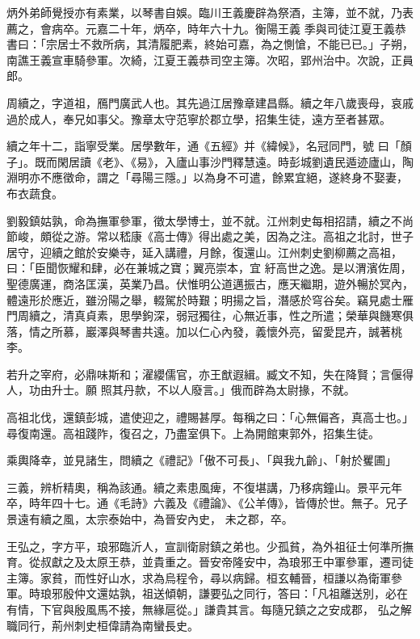 \begin{pinyinscope}
 炳外弟師覺授亦有素業，以琴書自娛。臨川王義慶辟為祭酒，主簿，並不就，乃表薦之，會病卒。元嘉二十年，炳卒，時年六十九。衡陽王義
 季與司徒江夏王義恭書曰：「宗居士不救所病，其清履肥素，終始可嘉，為之惻愴，不能已已。」子朔，南譙王義宣車騎參軍。次綺，江夏王義恭司空主簿。次昭，郢州治中。次說，正員郎。



 周續之，字道祖，鴈門廣武人也。其先過江居豫章建昌縣。續之年八歲喪母，哀戚過於成人，奉兄如事父。豫章太守范寧於郡立學，招集生徒，遠方至者甚眾。



 續之年十二，詣寧受業。居學數年，通《五經》并《緯候》，名冠同門，號
 曰「顏子」。既而閑居讀《老》、《易》，入廬山事沙門釋慧遠。時彭城劉遺民遁迹廬山，陶淵明亦不應徵命，謂之「尋陽三隱。」以為身不可遣，餘累宜絕，遂終身不娶妻，布衣蔬食。



 劉毅鎮姑孰，命為撫軍參軍，徵太學博士，並不就。江州刺史每相招請，續之不尚節峻，頗從之游。常以嵇康《高士傳》得出處之美，因為之注。高祖之北討，世子居守，迎續之館於安樂寺，延入講禮，月餘，復還山。江州刺史劉柳薦之高祖，曰：「臣聞恢耀和肆，必在兼城之寶；翼亮崇本，宜
 紆高世之逸。是以渭濱佐周，聖德廣運，商洛匡漢，英業乃昌。伏惟明公道邁振古，應天繼期，遊外暢於冥內，體遠形於應近，雖汾陽之舉，輟駕於時艱；明揚之旨，潛感於穹谷矣。竊見處士雁門周續之，清真貞素，思學鉤深，弱冠獨往，心無近事，性之所遣；榮華與饑寒俱落，情之所慕，巖澤與琴書共遠。加以仁心內發，義懷外亮，留愛昆卉，誠著桃李。



 若升之宰府，必鼎味斯和；濯纓儒官，亦王猷遐緝。臧文不知，失在降賢；言偃得人，功由升士。願
 照其丹款，不以人廢言。」俄而辟為太尉掾，不就。



 高祖北伐，還鎮彭城，遣使迎之，禮賜甚厚。每稱之曰：「心無偏吝，真高士也。」尋復南還。高祖踐阼，復召之，乃盡室俱下。上為開館東郭外，招集生徒。



 乘輿降幸，並見諸生，問續之《禮記》「傲不可長」、「與我九齡」、「射於矍圃」



 三義，辨析精奧，稱為該通。續之素患風痺，不復堪講，乃移病鐘山。景平元年卒，時年四十七。通《毛詩》六義及《禮論》、《公羊傳》，皆傳於世。無子。兄子景遠有續之風，太宗泰始中，為晉安內史，
 未之郡，卒。



 王弘之，字方平，琅邪臨沂人，宣訓衛尉鎮之弟也。少孤貧，為外祖征士何準所撫育。從叔獻之及太原王恭，並貴重之。晉安帝隆安中，為琅邪王中軍參軍，遷司徒主簿。家貧，而性好山水，求為烏程令，尋以病歸。桓玄輔晉，桓謙以為衛軍參軍。時琅邪殷仲文還姑孰，祖送傾朝，謙要弘之同行，答曰：「凡祖離送別，必在有情，下官與殷風馬不接，無緣扈從。」謙貴其言。每隨兄鎮之之安成郡，
 弘之解職同行，荊州刺史桓偉請為南蠻長史。




\end{pinyinscope}
